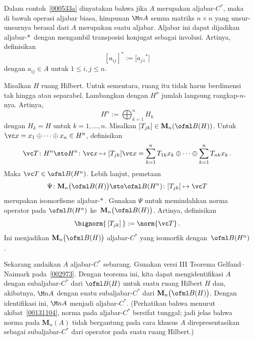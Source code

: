 \begin{exam} Dalam contoh~\ref{000533a} dinyatakan bahwa jika $A$ merupakan aljabar-$C^*$, maka di bawah
operasi aljabar biasa, himpunan $\M nA$ semua matriks $n \times n$ yang unsur-unsurnya berasal dari
$A$ merupakan suatu aljabar. Aljabar ini dapat dijadikan aljabar-$*\,$ dengan mengambil transposisi
konjugat sebagai involusi. Artinya, definisikan
   \[ [ a_{ij}]^* := \bigl[ {a_{j\,i}}^*\bigr] \]
dengan $a_{ij} \in A$ untuk $1 \le i,j \le n$.

Misalkan $H$ ruang Hilbert. Untuk sementara, ruang itu tidak harus berdimensi tak hingga atau
separabel. Lambangkan dengan $H^n$ jumlah langsung rangkap-$n$-nya. Artinya,
   \[ H^n := \bigoplus_{k=1}^n H_k \]
dengan $H_k = H$ untuk $k = 1, \dots, n$. Misalkan $[T_{jk}] \in \mathbf M_n(\ofml B(H))$. Untuk
$\vc x = x_1 \oplus \dots \oplus x_n \in H^n$, definisikan
   \[ \vc T \colon H^n \sto H^n \colon \vc x \mapsto [T_{jk}] \vc x =
            \sum_{k=1}^n T_{1k}x_k \oplus \dots \oplus \sum_{k=1}^n T_{nk}x_k \,. \]
Maka $\vc T \in \ofml B(H^n)$. Lebih lanjut, pemetaan
   \[ \Psi \colon \mathbf M_n\bigl(\ofml B(H)\bigr) \sto \ofml B(H^n) \colon
             [T_{jk}] \mapsto \vc T \]
merupakan isomorfisme aljabar-$*\,$. Gunakan $\Psi$ untuk memindahkan norma operator pada $\ofml
B(H^n)$ ke~$\mathbf M_n\bigl(\ofml B(H)\bigr)$. Artinya, definisikan
   \[ \bignorm{\,[T_{jk}]\,} := \norm{\vc T}\,. \]
Ini menjadikan $\mathbf M_n\bigl(\ofml B(H)\bigr)$ aljabar-$C^*$ yang isomorfik dengan~$\ofml
B(H^n)$.

Sekarang andaikan $A$ aljabar-$C^*$ sebarang. Gunakan versi III Teorema
Gelfand--Naimark pada~\ref{002973}. Dengan teorema ini, kita dapat mengidentifikasi $A$ dengan
subaljabar-$C^*$ dari $\ofml B(H)$ untuk suatu ruang Hilbert $H$ dan, akibatnya,
$\M nA$ dengan suatu subaljabar-$C^*$ dari $\mathbf M_n\bigl(\ofml B(H)\bigr)$. Dengan
identifikasi ini, $\M nA$ menjadi aljabar-$C^*$. (Perhatikan bahwa menurut akibat~\ref{00131104},
norma pada aljabar-$C^*$ bersifat tunggal; jadi jelas bahwa norma pada $\mathbf M_n(A)$
tidak bergantung pada cara khusus $A$ direpresentasikan sebagai subaljabar-$C^*$ dari
operator pada suatu ruang Hilbert.)
\end{exam}

